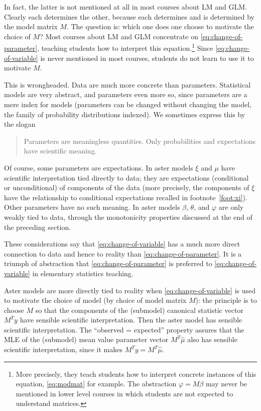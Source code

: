 \documentclass[11pt]{article}
\begin{document}
In fact, the latter is not
mentioned at all in most courses about LM and GLM.  Clearly each determines
the other, because each determines and is determined by the model matrix $M$.
The question
is: which one does one choose to motivate the choice of $M$?
Most courses about LM and GLM concentrate on \eqref{eq:change-of-parameter},
teaching students how to interpret this equation.\footnote{More precisely,
they teach students how to interpret concrete instances of this equation,
\eqref{eq:modmat} for example.  The abstraction $\varphi = M \beta$ may
never be mentioned in lower level courses in which students are not expected
to understand matrices.}
Since \eqref{eq:change-of-variable} is never mentioned in most courses,
students do not learn to use it to motivate $M$.

This is wrongheaded.  Data are much more concrete than parameters.  Statistical
models are very abstract, and parameters even more so, since parameters are
a mere index for models (parameters can be changed without changing the model,
the family of probability distributions indexed).  We sometimes express this
by the slogan \label{pg:meaningless}
\begin{quote}
Parameters are meaningless quantities.  Only probabilities and expectations
have scientific meaning.
\end{quote}
Of course, some parameters are expectations.  In aster models $\xi$ and $\mu$
have scientific interpretation tied directly to data; they are expectations
(conditional or unconditional) of components of the data (more precisely,
the components of $\xi$ have the relationship to conditional expectations
recalled in footnote~\ref{foot:xi}).  Other parameters
have no such meaning.  In aster models $\beta$, $\theta$, and $\varphi$ are
only weakly tied to data, through the monotonicity properties discussed at
the end of the preceding section.

These considerations say that \eqref{eq:change-of-variable} has a much more
direct connection to data and hence to reality
than \eqref{eq:change-of-parameter}.  It is a triumph of abstraction that
\eqref{eq:change-of-parameter} is preferred to \eqref{eq:change-of-variable}
in elementary statistics teaching.

Aster models are more directly tied to reality
when \eqref{eq:change-of-variable} is used to motivate the choice of model
(by choice of model matrix $M$): the principle is to choose $M$ so that
the components of the (submodel) canonical statistic vector $M^T y$ have
sensible scientific interpretation.  Then the aster model has sensible
scientific interpretation.  The ``observed = expected'' property assures
that the MLE of the (submodel) mean value parameter vector $M^T \hat{\mu}$
also has sensible scientific interpretation,
since it makes $M^T y = M^T \hat{\mu}$.
\end{document}
